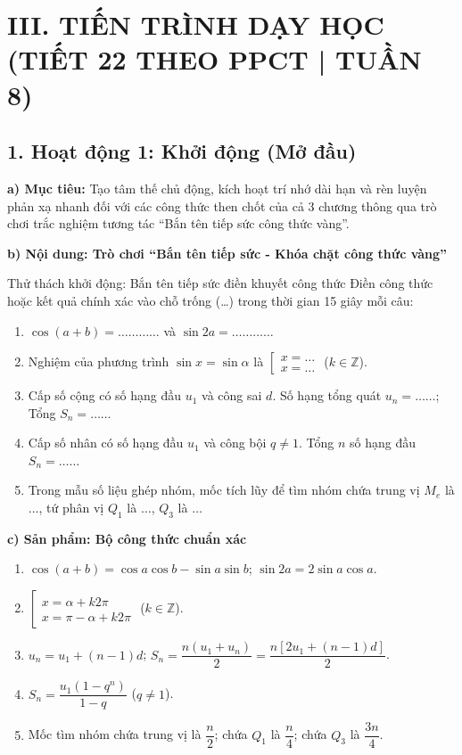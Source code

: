 \documentclass[12pt, a4paper]{article}
\begin{document}
\section*{III. TIẾN TRÌNH DẠY HỌC (TIẾT 22 THEO PPCT | TUẦN 8)}

\subsection*{1. Hoạt động 1: Khởi động (Mở đầu)}

\noindent \textbf{a) Mục tiêu:}
Tạo tâm thế chủ động, kích hoạt trí nhớ dài hạn và rèn luyện phản xạ nhanh đối với các công thức then chốt của cả 3 chương thông qua trò chơi trắc nghiệm tương tác ``Bắn tên tiếp sức công thức vàng''.

\noindent \textbf{b) Nội dung: Trò chơi ``Bắn tên tiếp sức - Khóa chặt công thức vàng''}
\begin{pedabox}{Thử thách khởi động: Bắn tên tiếp sức điền khuyết công thức}
Điền công thức hoặc kết quả chính xác vào chỗ trống (\dots) trong thời gian 15 giây mỗi câu:
\begin{enumerate}[leftmargin=0.6cm]
    \item $\cos(a + b) = \dots \dots \dots \dots$ và $\sin 2a = \dots \dots \dots \dots$
    \item Nghiệm của phương trình $\sin x = \sin \alpha$ là $\left[\begin{array}{l} x = \dots \\ x = \dots \end{array}\right.$ ($k \in \mathbb{Z}$).
    \item Cấp số cộng có số hạng đầu $u_1$ và công sai $d$. Số hạng tổng quát $u_n = \dots \dots$; Tổng $S_n = \dots \dots$
    \item Cấp số nhân có số hạng đầu $u_1$ và công bội $q \neq 1$. Tổng $n$ số hạng đầu $S_n = \dots \dots$
    \item Trong mẫu số liệu ghép nhóm, mốc tích lũy để tìm nhóm chứa trung vị $M_e$ là $\dots$, tứ phân vị $Q_1$ là $\dots$, $Q_3$ là $\dots$
\end{enumerate}
\end{pedabox}

\noindent \textbf{c) Sản phẩm: Bộ công thức chuẩn xác}
\begin{enumerate}[leftmargin=0.6cm]
    \item $\cos(a + b) = \cos a \cos b - \sin a \sin b$; \quad $\sin 2a = 2\sin a \cos a$.
    \item $\left[\begin{array}{l} x = \alpha + k2\pi \\ x = \pi - \alpha + k2\pi \end{array}\right.$ ($k \in \mathbb{Z}$).
    \item $u_n = u_1 + (n-1)d$; \quad $S_n = \dfrac{n(u_1 + u_n)}{2} = \dfrac{n[2u_1 + (n-1)d]}{2}$.
    \item $S_n = \dfrac{u_1(1 - q^n)}{1 - q}$ ($q \neq 1$).
    \item Mốc tìm nhóm chứa trung vị là $\dfrac{n}{2}$; chứa $Q_1$ là $\dfrac{n}{4}$; chứa $Q_3$ là $\dfrac{3n}{4}$.
\end{enumerate}
\end{document}
